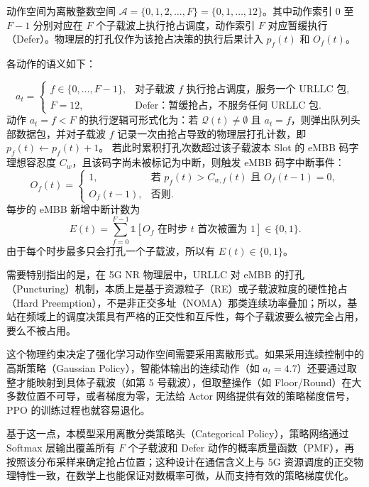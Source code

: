 动作空间为离散整数空间 \(\mathcal{A} = \{0, 1, 2, \ldots, F\} = \{0, 1, \ldots, 12\}\)。其中动作索引 $0$ 至 $F-1$ 分别对应在 $F$ 个子载波上执行抢占调度，动作索引 $F$ 对应暂缓执行（Defer）。物理层的打孔仅作为该抢占决策的执行后果计入 \(p_f(t)\) 和 \(O_f(t)\)。

各动作的语义如下：

\begin{equation}
a_t =
\begin{cases}
f \in \{0,\ldots,F-1\}, & \text{对子载波 } f \text{ 执行抢占调度，服务一个 URLLC 包}, \\
F = 12, & \text{Defer：暂缓抢占，不服务任何 URLLC 包}.
\end{cases}
\label{eq:action_semantics}
\end{equation}
动作 \(a_t = f < F\) 的执行逻辑可形式化为：若 \(\mathcal{Q}(t) \neq \emptyset\) 且 \(a_t = f\)，则弹出队列头部数据包，并对子载波 \(f\) 记录一次由抢占导致的物理层打孔计数，即 \(p_f(t) \leftarrow p_f(t) + 1\)。
若此时累积打孔次数超过该子载波本 Slot 的 eMBB 码字理想容忍度 \(C_w\)，且该码字尚未被标记为中断，则触发 eMBB 码字中断事件：
\begin{equation}
O_f(t) =
\begin{cases}
1, & \text{若 } p_f(t) > C_{w,f}(t) \text{ 且 } O_f(t-1) = 0, \\
O_f(t-1), & \text{否则}.
\end{cases}
\label{eq:embb_outage_state}
\end{equation}
每步的 eMBB 新增中断计数为
\begin{equation}
E(t) = \sum_{f=0}^{F-1} \mathbb{1}\!\left[O_f \text{ 在时步 } t \text{ 首次被置为 1}\right] \in \{0, 1\}.
\label{eq:embb_new_outage_count}
\end{equation}
由于每个时步最多只会打孔一个子载波，所以有 \(E(t) \in \{0, 1\}\)。

需要特别指出的是，在 5G NR 物理层中，URLLC 对 eMBB 的打孔（Puncturing）机制，本质上是基于资源粒子（RE）或子载波粒度的硬性抢占（Hard Preemption），不是非正交多址（NOMA）那类连续功率叠加；所以，基站在频域上的调度决策具有严格的正交性和互斥性，每个子载波要么被完全占用，要么不被占用。

这个物理约束决定了强化学习动作空间需要采用离散形式。如果采用连续控制中的高斯策略（Gaussian Policy），智能体输出的连续动作（如 $a_t = 4.7$）还要通过取整才能映射到具体子载波（如第 5 号载波），但取整操作（如 Floor/Round）在大多数位置不可导，或者梯度为零，无法给 Actor 网络提供有效的策略梯度信号，PPO 的训练过程也就容易退化。

基于这一点，本模型采用离散分类策略头（Categorical Policy），策略网络通过 Softmax 层输出覆盖所有 $F$ 个子载波和 Defer 动作的概率质量函数（PMF），再按照该分布采样来确定抢占位置；这种设计在通信含义上与 5G 资源调度的正交物理特性一致，在数学上也能保证对数概率可微，从而支持有效的策略梯度优化。












